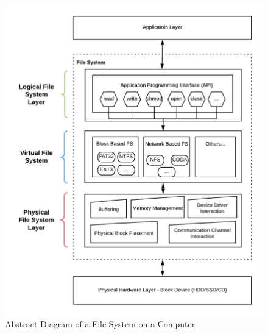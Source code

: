 \documentclass{beamer}
\begin{document}
\begin{frame}
	\begin{figure}[h]
		\begin{minipage}[c]{0.6\textwidth}
			\includegraphics[scale=0.53]{abstract-fs-diagram}
		\end{minipage}\hfill
		\begin{minipage}[c]{0.37\textwidth}
			\caption{Abstract Diagram of a File System on a Computer}
			\label{fig:abstract-fs-diagram}	
		\end{minipage}
	\end{figure}
\end{frame}
\end{document}
